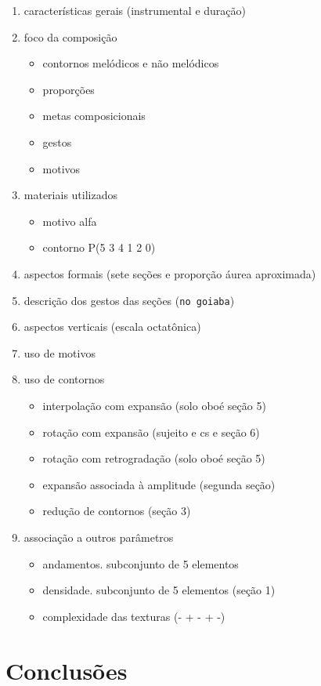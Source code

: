 \documentclass[12pt,a4paper]{article}
\begin{document}
\begin{enumerate}
\item características gerais (instrumental e duração)
\item foco da composição
  \begin{itemize}
  \item contornos melódicos e não melódicos
  \item proporções
  \item metas composicionais
  \item gestos
  \item motivos
  \end{itemize}
\item materiais utilizados
  \begin{itemize}
  \item motivo alfa
  \item contorno P(5 3 4 1 2 0)
  \end{itemize}
\item aspectos formais (sete seções e proporção áurea aproximada)
\item descrição dos gestos das seções (\texttt{no goiaba})
\item aspectos verticais (escala octatônica)
\item uso de motivos
\item uso de contornos
  \begin{itemize}
  \item interpolação com expansão (solo oboé seção 5)
  \item rotação com expansão (sujeito e cs e seção 6)
  \item rotação com retrogradação (solo oboé seção 5)
  \item expansão associada à amplitude (segunda seção)
  \item redução de contornos (seção 3)
  \end{itemize}
\item associação a outros parâmetros
  \begin{itemize}
  \item andamentos. subconjunto de 5 elementos
  \item densidade. subconjunto de 5 elementos (seção 1)
  \item complexidade das texturas (- + - + -)
  \end{itemize}
\end{enumerate}

\section{Conclusões}
\end{document}
